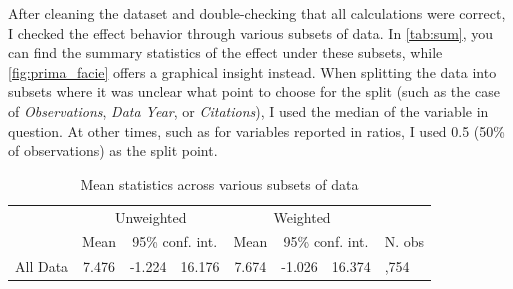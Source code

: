 After cleaning the dataset and double-checking that all calculations were correct, I checked the effect behavior through various subsets of data. In \autoref{tab:sum}, you can find the summary statistics of the effect under these subsets, while \autoref{fig:prima_facie} offers a graphical insight instead. When splitting the data into subsets where it was unclear what point to choose for the split (such as the case of \textit{Observations}, \textit{Data Year}, or \textit{Citations}), I used the median of the variable in question. At other times, such as for variables reported in ratios, I used 0.5 (50\% of observations) as the split point.
\begin{table}[!htbp]
   \centering
   \scriptsize
   \singlespace
   \caption{Mean statistics across various subsets of data}
   \label{tab:sum}
   \begin{tabular}{
      @{}
      l %
      *{6}{c} %
      >{\centering\arraybackslash}p{1cm} %
      @{}
      }
      \toprule
                                  & \multicolumn{3}{c}{Unweighted} & \multicolumn{3}{c}{Weighted}        &                                                                        \\
      \cmidrule(lr){2-4} \cmidrule(lr){5-7}
                                  & Mean                           & \multicolumn{2}{c}{95\% conf. int.} & Mean   & \multicolumn{2}{c}{95\% conf. int.} & N. obs                  \\

      \midrule
      All Data                    & 7.476                          & -1.224                              & 16.176 & 7.674                               & -1.026 & 16.374 & 1,754 \\
      \midrule


\end{tabular}
\end{table}
